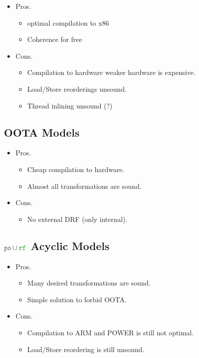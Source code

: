 \begin{itemize}
  \item Pros.
  \begin{itemize}
    \item optimal compilation to x86
    \item Coherence for free
  \end{itemize}
  \item Cons.
  \begin{itemize}
    \item Compilation to hardware weaker hardware is expensive.
    \item Load/Store reorderings unsound.
    \item Thread inlining unsound (?)
  \end{itemize}
\end{itemize}

\subsection{OOTA Models}

\begin{itemize}
  \item Pros.
  \begin{itemize}
    \item Cheap compilation to hardware.
    \item Almost all transformations are sound. 
  \end{itemize}
  \item Cons.
  \begin{itemize}
    \item No external DRF (only internal).
  \end{itemize}
\end{itemize}

\subsection{$\lPO\cup\lRF$ Acyclic Models}

\begin{itemize}
  \item Pros.
  \begin{itemize}
    \item Many desired transformations are sound. 
    \item Simple solution to forbid OOTA.
  \end{itemize}
  \item Cons.
  \begin{itemize}
    \item Compilation to ARM and POWER is still not optimal.
    \item Load/Store reordering is still unsound.
  \end{itemize}
\end{itemize}

